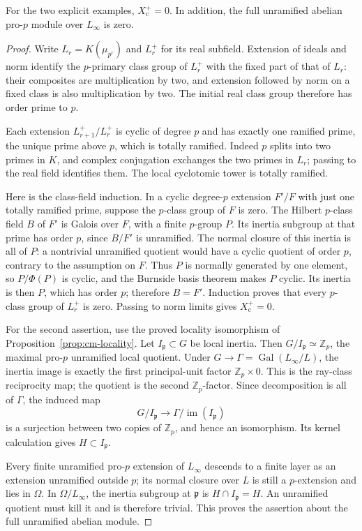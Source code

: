\begin{proposition}\label{prop:cm-unramified-zero}
For the two explicit examples, \(X_{\mathrm c}^+=0\).
In addition, the full unramified abelian pro-\(p\)
module over \(L_\infty\) is zero.
\end{proposition}
\begin{proof}
Write \(L_r=K(\mu_{p^r})\) and \(L_r^+\) for its real
subfield. Extension of ideals and norm identify the
\(p\)-primary class group of \(L_r^+\) with the fixed
part of that of \(L_r\): their composites are multiplication
by two, and extension followed by norm on a fixed class
is also multiplication by two. The initial real class
group therefore has order prime to \(p\).

Each extension \(L_{r+1}^+/L_r^+\) is cyclic of degree
\(p\) and has exactly one ramified prime, the unique
prime above \(p\), which is totally ramified.
Indeed \(p\) splits into two primes in \(K\), and complex
conjugation exchanges the two primes in \(L_r\);
passing to the real field identifies them. The local
cyclotomic tower is totally ramified.

Here is the class-field induction. In a cyclic degree-\(p\)
extension \(F'/F\) with just one totally ramified prime,
suppose the \(p\)-class group of \(F\) is zero.
The Hilbert \(p\)-class field \(B\) of \(F'\) is Galois
over \(F\), with a finite \(p\)-group \(P\). Its inertia
subgroup at that prime has order \(p\), since \(B/F'\)
is unramified. The normal closure of this inertia is
all of \(P\): a nontrivial unramified quotient would
have a cyclic quotient of order \(p\), contrary to
the assumption on \(F\). Thus \(P\) is normally
generated by one element, so \(P/\Phi(P)\) is cyclic,
and the Burnside basis theorem makes \(P\) cyclic.
Its inertia is then \(P\), which has order \(p\);
therefore \(B=F'\). Induction proves that every
\(p\)-class group of \(L_r^+\) is zero. Passing to
norm limits gives \(X_{\mathrm c}^+=0\).

For the second assertion, use the proved locality
isomorphism of Proposition~\ref{prop:cm-locality}.
Let \(I_{\mathfrak p}\subset G\) be local inertia.
Then \(G/I_{\mathfrak p}\simeq\mathbb Z_p\), the
maximal pro-\(p\) unramified local quotient.
Under \(G\to\Gamma=\operatorname{Gal}(L_\infty/L)\),
the inertia image is exactly the first principal-unit
factor \(\mathbb Z_p\times0\). This is the ray-class
reciprocity map; the quotient is the second
\(\mathbb Z_p\)-factor. Since decomposition is all
of \(\Gamma\), the induced map
\[
 G/I_{\mathfrak p}\longrightarrow
 \Gamma/\operatorname{im}(I_{\mathfrak p})
\]
is a surjection between two copies of \(\mathbb Z_p\),
and hence an isomorphism. Its kernel calculation
gives \(H\subset I_{\mathfrak p}\).

Every finite unramified pro-\(p\) extension of
\(L_\infty\) descends to a finite layer as an extension
unramified outside \(p\); its normal closure over \(L\)
is still a \(p\)-extension and lies in \(\Omega\).
In \(\Omega/L_\infty\), the inertia subgroup at
\(\mathfrak p\) is \(H\cap I_{\mathfrak p}=H\).
An unramified quotient must kill it and is therefore
trivial. This proves the assertion about the full
unramified abelian module.
\end{proof}

